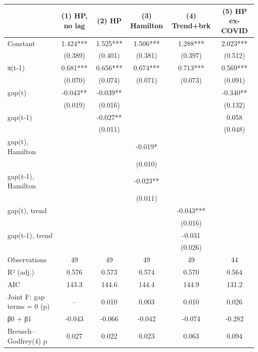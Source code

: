 \begin{tabular}{lccccc}
\toprule
 & (1) HP, no lag & (2) HP & (3) Hamilton & (4) Trend+brk & (5) HP ex-COVID \\
\midrule
Constant & 1.424*** & 1.525*** & 1.506*** & 1.288*** & 2.023*** \\
   & (0.389) & (0.401) & (0.381) & (0.397) & (0.512) \\
π(t-1) & 0.681*** & 0.656*** & 0.674*** & 0.713*** & 0.569*** \\
     & (0.070) & (0.074) & (0.071) & (0.073) & (0.091) \\
gap(t) & -0.043** & -0.039** &  &  & -0.340** \\
       & (0.019) & (0.016) &  &  & (0.132) \\
gap(t-1) &  & -0.027** &  &  & 0.058 \\
         &  & (0.011) &  &  & (0.048) \\
gap(t), Hamilton &  &  & -0.019* &  &  \\
           &  &  & (0.010) &  &  \\
gap(t-1), Hamilton &  &  & -0.023** &  &  \\
             &  &  & (0.011) &  &  \\
gap(t), trend &  &  &  & -0.043*** &  \\
               &  &  &  & (0.016) &  \\
gap(t-1), trend &  &  &  & -0.031 &  \\
                 &  &  &  & (0.026) &  \\
Observations & 49 & 49 & 49 & 49 & 44 \\
R² (adj.) & 0.576 & 0.573 & 0.574 & 0.570 & 0.564 \\
AIC & 143.3 & 144.6 & 144.4 & 144.9 & 131.2 \\
Joint F: gap terms = 0 (p) & – & 0.010 & 0.003 & 0.010 & 0.026 \\
β0 + β1 & -0.043 & -0.066 & -0.042 & -0.074 & -0.282 \\
Breusch–Godfrey(4) p & 0.027 & 0.022 & 0.023 & 0.063 & 0.094 \\
\bottomrule
\end{tabular}
